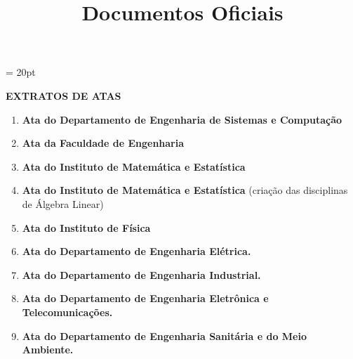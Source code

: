 \documentclass[12pt,a4paper]{article}
\title{Documentos Oficiais}
\begin{document}
\thispagestyle{firstpage} %
\headsep = 20pt
\setlength{\parindent}{0cm} %
\setlength{\tabcolsep}{5pt} %
\vspace*{2.0cm}

\textbf{EXTRATOS DE ATAS}

\begin{enumerate}
  \item \textbf{Ata do Departamento de Engenharia de Sistemas e Computação}  \\
  \item \textbf{Ata da Faculdade de Engenharia}  \\
  \item \textbf{Ata do Instituto de Matemática e Estatística}  \\
  \item \textbf{Ata do Instituto de Matemática e Estatística} (criação das disciplinas de Álgebra Linear) \\
  \item \textbf{Ata do Instituto de Física}  \\
  \item \textbf{Ata do Departamento de Engenharia Elétrica.}  \\
  \item \textbf{Ata do Departamento de Engenharia Industrial.}  \\
  \item \textbf{Ata do Departamento de Engenharia Eletrônica e Telecomunicações.}  \\
  \item \textbf{Ata do Departamento de Engenharia Sanitária e do Meio Ambiente.}  \\
\end{enumerate}
\end{document}

